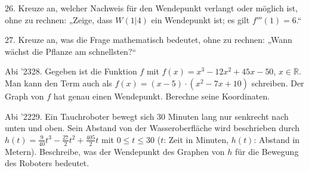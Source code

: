 \documentclass[11pt]{article}
\begin{document}
\begin{pfaufg}{}{26.}{}
Kreuze an, welcher Nachweis für den Wendepunkt verlangt oder möglich ist, ohne zu rechnen: „Zeige, dass $W(1 | 4)$ ein Wendepunkt ist; es gilt $f'''(1) = 6$.“ 
\end{pfaufg}
\begin{pfaufg}{}{27.}{}
Kreuze an, was die Frage mathematisch bedeutet, ohne zu rechnen: „Wann wächst die Pflanze am schnellsten?“ 
\end{pfaufg}
\pfgruppe{}
\begin{pfaufg}{Abi ’23}{28.}{}
Gegeben ist die Funktion $f$ mit $f(x) = x^3 - 12x^2 + 45x - 50$, $x \in \mathbb{R}$. Man kann den Term auch als $f(x) = (x - 5)\cdot(x^2 - 7x + 10)$ schreiben. Der Graph von $f$ hat genau einen Wendepunkt. Berechne seine Koordinaten.
\end{pfaufg}
\pfgruppe{}
\begin{pfaufg}{Abi ’22}{29.}{}
Ein Tauchroboter bewegt sich 30 Minuten lang nur senkrecht nach unten und oben. Sein Abstand von der Wasseroberfläche wird beschrieben durch $h(t) = \tfrac{9}{40}t^3 - \tfrac{27}{2}t^2 + \tfrac{405}{2}t$ mit $0 \le t \le 30$ ($t$: Zeit in Minuten, $h(t)$: Abstand in Metern). Beschreibe, was der Wendepunkt des Graphen von $h$ für die Bewegung des Roboters bedeutet.
\par\smallskip\noindent {}\par
{}
\end{pfaufg}
\end{document}
